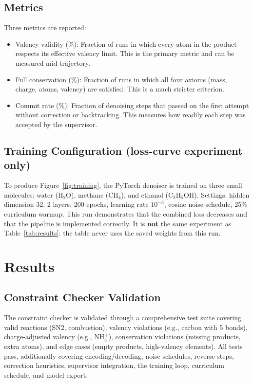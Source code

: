 \documentclass[11pt]{article}
\begin{document}
\subsection{Metrics}

Three metrics are reported:

\begin{itemize}[nosep]
  \item Valency validity (\%): Fraction of runs in which every atom in
        the product respects its effective valency limit. This is the
        primary metric and can be measured mid-trajectory.
  \item Full conservation (\%): Fraction of runs in which all four
        axioms (mass, charge, atoms, valency) are satisfied. This is a
        much stricter criterion.
  \item Commit rate (\%): Fraction of denoising steps that passed on the
        first attempt without correction or backtracking. This measures
        how readily each step was accepted by the supervisor.
\end{itemize}

\subsection{Training Configuration (loss-curve experiment only)}

To produce Figure~\ref{fig:training}, the PyTorch denoiser is trained on
three small molecules: water (H$_2$O), methane (CH$_4$), and ethanol
(C$_2$H$_5$OH). Settings: hidden dimension 32, 2 layers, 200 epochs,
learning rate $10^{-3}$, cosine noise schedule, 25\% curriculum warmup.
This run demonstrates that the combined loss decreases and that the
pipeline is implemented correctly. It is \textbf{not} the same experiment
as Table~\ref{tab:results}: the table never uses the saved weights from
this run.

\section{Results}

\subsection{Constraint Checker Validation}

The constraint checker is validated through a comprehensive test suite
covering valid reactions (SN2, combustion), valency violations (e.g.,
carbon with 5 bonds), charge-adjusted valency (e.g., NH$_4^+$),
conservation violations (missing products, extra atoms), and edge cases
(empty products, high-valency elements). All tests pass, additionally
covering encoding/decoding, noise schedules, reverse steps, correction
heuristics, supervisor integration, the training loop, curriculum
schedule, and model export.
\end{document}
